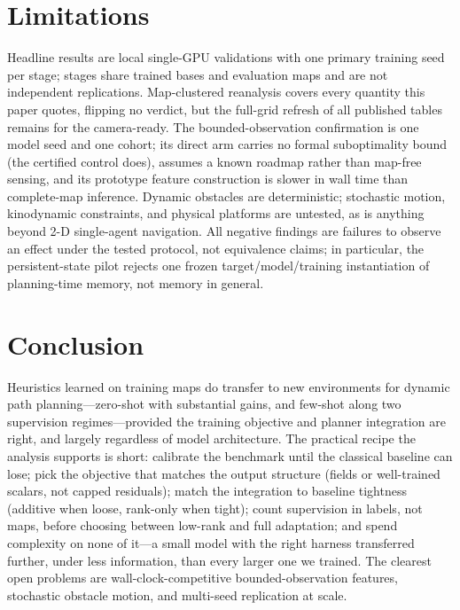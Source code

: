 \documentclass[letterpaper]{article} %
\begin{document}
\section{Limitations}

Headline results are local single-GPU validations with one primary training seed per stage; stages share trained bases and evaluation maps and are not independent replications. Map-clustered reanalysis covers every quantity this paper quotes, flipping no verdict, but the full-grid refresh of all published tables remains for the camera-ready. The bounded-observation confirmation is one model seed and one cohort; its direct arm carries no formal suboptimality bound (the certified control does), assumes a known roadmap rather than map-free sensing, and its prototype feature construction is slower in wall time than complete-map inference. Dynamic obstacles are deterministic; stochastic motion, kinodynamic constraints, and physical platforms are untested, as is anything beyond 2-D single-agent navigation. All negative findings are failures to observe an effect under the tested protocol, not equivalence claims; in particular, the persistent-state pilot rejects one frozen target/model/training instantiation of planning-time memory, not memory in general.

\section{Conclusion}

Heuristics learned on training maps do transfer to new environments for dynamic path planning---zero-shot with substantial gains, and few-shot along two supervision regimes---provided the training objective and planner integration are right, and largely regardless of model architecture. The practical recipe the analysis supports is short: calibrate the benchmark until the classical baseline can lose; pick the objective that matches the output structure (fields or well-trained scalars, not capped residuals); match the integration to baseline tightness (additive when loose, rank-only when tight); count supervision in labels, not maps, before choosing between low-rank and full adaptation; and spend complexity on none of it---a small model with the right harness transferred further, under less information, than every larger one we trained. The clearest open problems are wall-clock-competitive bounded-observation features, stochastic obstacle motion, and multi-seed replication at scale.



% 
\end{document}
